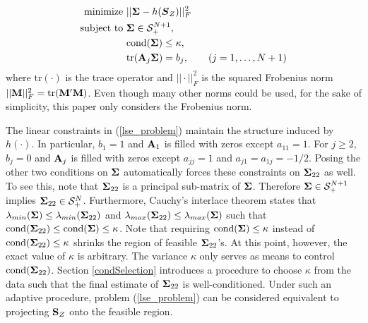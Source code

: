 \documentclass[11pt]{article}
\newcommand{\UNIT}{\text{UNIT}}
\newcommand{\SD}{\text{SD}}
\newcommand{\R}{\mathbb{R}}
\theoremstyle{definition}
\theoremstyle{definition}
\def\bSigma{{\bf \Sigma}}
\def\A{{\bf A}}
\def\M{{\bf M}}
\def\SS{{\bf S}}
\def\cond{\text{cond}}
\def\Tr{\text{tr}}
\begin{document}
\begin{align}
 \label{lse_problem}
 \begin{split}
\text{minimize } &  || \bSigma - h(\boldsymbol{S}_Z) ||_F^2\\
\text{subject to } & \bSigma \in \mathcal{S}_{+}^{N+1},\\
& \cond(\bSigma) \leq \kappa,\\
& \Tr(\A_j \bSigma) = b_j, \hspace{2em} (j = 1, \dots, N+1) 
\end{split}
\end{align}
where $\Tr(\cdot)$ is the trace operator and $||\cdot||_F^2$ is the squared Frobenius norm $||\M||_F^2 = \Tr(\M'\M)$. Even though many other norms could be used, for the sake of simplicity, this paper only considers the Frobenius norm. 

The linear constraints in (\ref{lse_problem}) maintain the structure induced by $h(\cdot)$. In particular, $b_1 = 1$ and $\A_1$ is filled with zeros except $a_{11} = 1$. For $j \geq 2$, $b_j = 0$ and $\A_j$ is filled with zeros except $a_{jj} = 1$ and  $a_{j1} = a_{1j} = -1/2$. Posing the other two conditions on $\bSigma$ automatically forces these constraints on $\bSigma_{22}$ as well. To see this, note that $\bSigma_{22}$ is a principal sub-matrix of $\bSigma$. Therefore $\bSigma \in \mathcal{S}_{+}^{N+1}$ implies $\bSigma_{22} \in \mathcal{S}_{+}^{N}$. Furthermore, Cauchy's interlace theorem states that $\lambda_{min}(\bSigma) \leq \lambda_{min}(\bSigma_{22})$ and $\lambda_{max}(\bSigma_{22}) \leq \lambda_{max}(\bSigma)$ such that $\cond(\bSigma_{22}) \leq \cond(\bSigma) \leq \kappa$. Note that requiring $\cond(\bSigma) \leq \kappa$ instead of $\cond(\bSigma_{22}) \leq \kappa$ shrinks the region of feasible $\bSigma_{22}$'s. 
 At this point, however, the exact value of $\kappa$ is arbitrary. The variance $\kappa$ only serves as means to control $\cond(\bSigma_{22})$.  
 Section \ref{condSelection} introduces a procedure to choose $\kappa$ from the data such that the final estimate of $\bSigma_{22}$ is well-conditioned. Under such an adaptive procedure, problem (\ref{lse_problem}) can be considered equivalent to projecting $\SS_Z$ onto the feasible region. 
\end{document}
